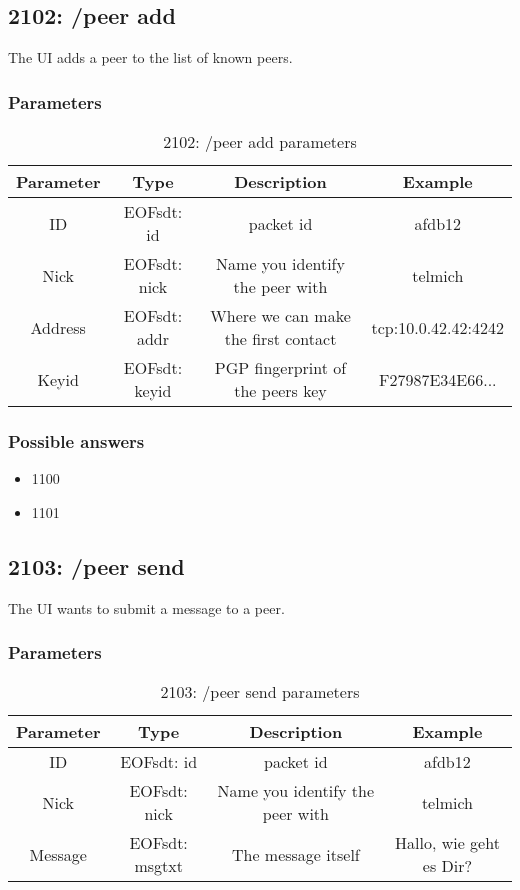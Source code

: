\documentclass[12pt,a4paper]{book}
\begin{document}
\subsection{2102: /peer add}
The UI adds a peer to the list of known peers.

\subsubsection{Parameters}
%
\begin{longtable}{|c|c|c|c|}
\caption{2102: /peer add parameters}\\
\hline
\textbf{Parameter} & \textbf{Type} & \textbf{Description} & \textbf{Example}\\
\hline
ID & EOFsdt: id & packet id & afdb12\\
\hline
Nick & EOFsdt: nick & Name you identify the peer with & telmich\\
\hline
Address & EOFsdt: addr & Where we can make the first contact & tcp:10.0.42.42:4242\\
\hline
Keyid & EOFsdt: keyid & PGP fingerprint of the peers key & F27987E34E66...\\
\hline
\end{longtable}

\subsubsection{Possible answers}
\begin{itemize}
\item 1100
\item 1101
\end{itemize}
\subsection{2103: /peer send}
The UI wants to submit a message to a peer.

\subsubsection{Parameters}
%
\begin{longtable}{|c|c|c|c|}
\caption{2103: /peer send parameters}\\
\hline
\textbf{Parameter} & \textbf{Type} & \textbf{Description} & \textbf{Example}\\
\hline
ID & EOFsdt: id & packet id & afdb12\\
\hline
Nick & EOFsdt: nick & Name you identify the peer with & telmich\\
\hline
Message & EOFsdt: msgtxt & The message itself & Hallo, wie geht es Dir?\\
\hline
\end{longtable}
\end{document}
